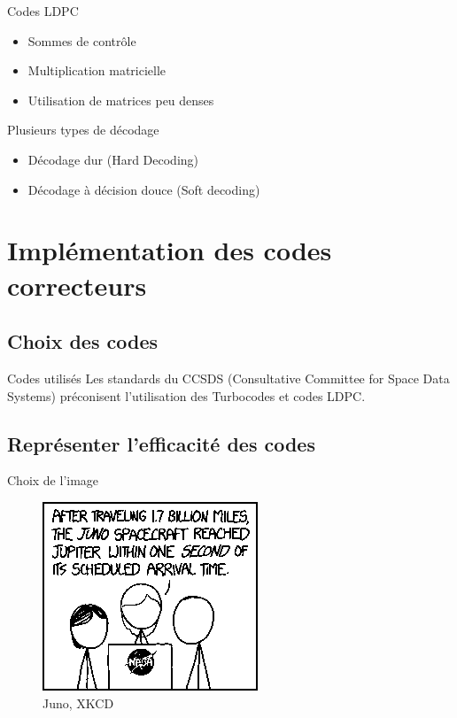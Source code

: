\documentclass[11pt]{beamer}
\begin{document}
\begin{frame}{Codes LDPC}
	\begin{itemize}
		\item Sommes de contrôle
		\item Multiplication matricielle
		\item Utilisation de matrices peu denses
	\end{itemize}
\end{frame}

\begin{frame}{Plusieurs types de d\'ecodage}
	\begin{itemize}
		\item D\'ecodage dur (Hard Decoding)
		\item D\'ecodage \`a d\'ecision douce (Soft decoding)
	\end{itemize}
\end{frame}


\section{Impl\'ementation des codes correcteurs}
\subsection{Choix des codes}


\begin{frame}{Codes utilis\'es}
	Les standards du CCSDS (Consultative Committee for Space Data Systems) pr\'econisent l'utilisation des Turbocodes et codes LDPC.
\end{frame}


\subsection{Repr\'esenter l'efficacit\'e des codes}


\begin{frame}{Choix de l'image}
	\begin{figure}
		\includegraphics[scale=0.8]{base}
		\caption{Juno, XKCD}
	\end{figure}
\end{frame}
\end{document}
